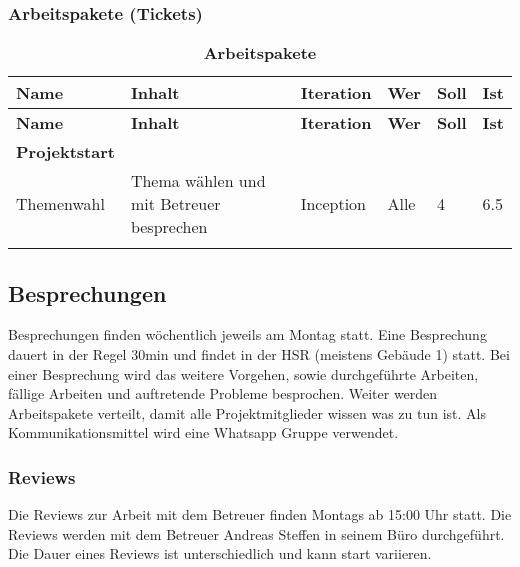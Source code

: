 \documentclass[a4,12pt]{scrartcl}
\begin{document}
\begin{landscape}
\subsubsection{Arbeitspakete (Tickets)}
\begin{longtable}{ p{5.5cm} p{8cm} l l p{1cm} p{1cm} }

\hline 
\multicolumn{1}{p{5.5cm}}{\textbf{Name}} & \multicolumn{1}{p{8cm}}{\textbf{Inhalt}} & \multicolumn{1}{l}{\textbf{Iteration}} & \multicolumn{1}{l}{\textbf{Wer}} & \multicolumn{1}{p{1cm}}{\textbf{Soll}} & \multicolumn{1}{p{1cm}}{\textbf{Ist}} \\ \hline 
\endfirsthead


\hline 
\multicolumn{1}{p{5.5cm}}{\textbf{Name}} & \multicolumn{1}{p{8cm}}{\textbf{Inhalt}} & \multicolumn{1}{l}{\textbf{Iteration}} & \multicolumn{1}{l}{\textbf{Wer}} & \multicolumn{1}{p{1cm}}{\textbf{Soll}} & \multicolumn{1}{p{1cm}}{\textbf{Ist}} \\ \hline 
\endhead


\textbf{Projektstart}&&&&\\ \addlinespace
Themenwahl & Thema wählen und mit Betreuer besprechen & Inception & Alle & 4 & 6.5\\ \addlinespace
\hline\caption{\textbf{Arbeitspakete}}
\end{longtable}
\end{landscape}




\subsection{Besprechungen}
Besprechungen finden wöchentlich jeweils am Montag statt. 
Eine Besprechung dauert in der Regel 30min und findet in der HSR (meistens Gebäude 1) statt. Bei einer Besprechung wird das weitere Vorgehen, sowie durchgeführte Arbeiten, fällige Arbeiten und auftretende Probleme besprochen. Weiter werden Arbeitspakete verteilt, damit alle Projektmitglieder wissen was zu tun ist. 
Als Kommunikationsmittel wird eine Whatsapp Gruppe verwendet. 

\subsubsection{Reviews}
Die Reviews zur Arbeit mit dem Betreuer finden Montags ab 15:00 Uhr statt. 
Die Reviews werden mit dem Betreuer Andreas Steffen in seinem Büro durchgeführt. Die Dauer eines Reviews ist unterschiedlich und kann start variieren. 
\end{document}
